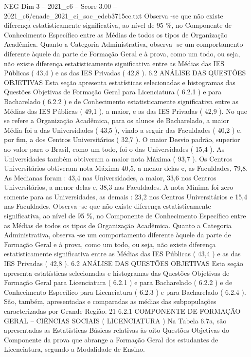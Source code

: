 \begin{textsample}{NEG Dim 3 – 2021\_c6 – Score 3.00 – 2021\_c6/enade\_2021\_ci\_soc\_edcb3715cc.txt}
Observa -se que não existe diferença estatisticamente significativa, ao nível de 95 \%, no Componente de Conhecimento Específico entre as Médias de todos os tipos de Organização Acadêmica.
Quanto a Categoria Administrativa, observa -se um comportamento diferente àquele da parte de Formação Geral e à prova, como um todo, ou seja, não existe diferença estatisticamente significativa entre as Médias das IES Públicas ( 43,4 ) e as das IES Privadas ( 42,8 ). 6.2 ANÁLISE DAS QUESTÕES OBJETIVAS Esta seção apresenta estatísticas selecionadas e histogramas das Questões Objetivas de Formação Geral para Licenciatura ( 6.2.1 ) e para Bacharelado ( 6.2.2 ) e de Conhecimento estatisticamente significativa entre as Médias das IES Públicas ( 49,1 ), a maior, e as das IES Privadas ( 42,9 ).
No que se refere a Organização Acadêmica, para os alunos de Bacharelado, a maior Média foi a das Universidades ( 43,5 ), vindo a seguir das Faculdades ( 40,2 ) e, por fim, a dos Centros Universitários ( 32,7 ).
O maior Desvio padrão, superior ao valor para o Brasil, como um todo, foi o das Universidades ( 15,4 ).
As Universidades também obtiveram a maior nota Máxima ( 93,7 ).
Os Centros Universitários obtiveram nota Máxima 40,5, a menor delas e, as Faculdades, 79,8.
As Medianas foram : 43,4 nas Universidades, a maior, 33,6 nos Centros Universitários, a menor delas e, 38,3 nas Faculdades.
A nota Mínima foi zero somente para as Universidades, as demais : 23,2 nos Centros Universitários e 15,4 nas Faculdades.
Observa -se que não existe diferença estatisticamente significativa, ao nível de 95 \%, no Componente de Conhecimento Específico entre as Médias de todos os tipos de Organização Acadêmica.
Quanto a Categoria Administrativa, observa -se um comportamento diferente àquele da parte de Formação Geral e à prova, como um todo, ou seja, não existe diferença estatisticamente significativa entre as Médias das IES Públicas ( 43,4 ) e as das IES Privadas ( 42,8 ). 6.2 ANÁLISE DAS QUESTÕES OBJETIVAS Esta seção apresenta estatísticas selecionadas e histogramas das Questões Objetivas de Formação Geral para Licenciatura ( 6.2.1 ) e para Bacharelado ( 6.2.2 ) e de Conhecimento Específico para Licenciatura ( 6.2.3 ) e para Bacharelado ( 6.2.4 ).
São, também, apresentadas e comparadas as médias das subpopulações caracterizadas por Grande Região. 21 6.2.1 COMPONENTE DE FORMAÇÃO GERAL – CIÊNCIAS SOCIAIS ( LICENCIATURA ) Na Tabela 6.7a, são apresentadas as Estatísticas Básicas relativas às oito Questões Objetivas do Componente da prova que abrange a Formação Geral dos estudantes de Licenciatura, segundo a Modalidade de Ensino.

\end{textsample}
